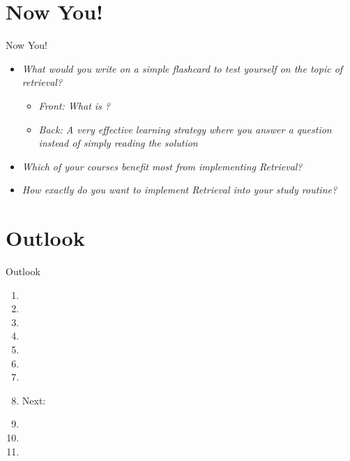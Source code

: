 \documentclass{ercisbeamer}
\begin{document}
\section{Now You!}
\begin{frame}{Now You!}
    \begin{itemize}
        \item \emph{What would you write on a simple flashcard to test yourself on the topic of retrieval?} \pause
        \begin{itemize}
            \item \emph{Front: What is ?}
            \item \emph{Back: A very effective learning strategy where you answer a question instead of simply reading the solution}
        \end{itemize}
        \item \emph{Which of your courses benefit most from implementing Retrieval?}
        \item \emph{How exactly do you want to implement Retrieval into your study routine?}
    \end{itemize}
\end{frame}


\section*{Outlook}
\begin{frame}{Outlook}
    \begin{enumerate}
        \item {}
        \vspace{.5em}
        \item {}
        \item {}
        \item {}
        \item {}
        \item {}
        \vspace{.5em}
        \item {}
        \item Next: 
        \item {}
        \item {}
        \item {}
    \end{enumerate}
\end{frame}


\sources
\end{document}
